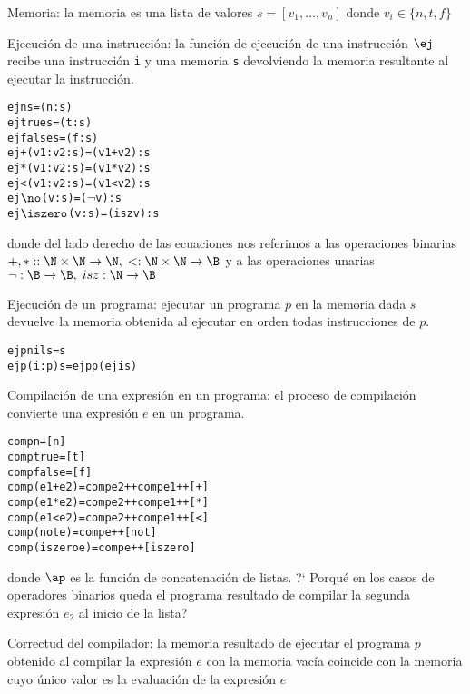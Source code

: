 \documentclass[11pt,letterpaper]{article}
\begin{document}
\item Memoria: la memoria es una lista de valores
$s=[v_1,\ldots,v_n]$ donde $v_i\in\{n,t,f\}$

\item Ejecución de una instrucción: la función de ejecución de una instrucción 
$\ej$ recibe una instrucción {\tt i} y una memoria {\tt s} devolviendo la 
memoria resultante al ejecutar la instrucción.

  \begin{alltt}
    ej n s = (n:s)
    ej true s = (t:s)
    ej false s = (f:s)
    ej + (v1:v2:s) = (v1+v2) : s 
    ej * (v1:v2:s) = (v1*v2) : s
    ej < (v1:v2:s) = (v1<v2) : s
    ej \(\no\) (v:s) = (\(\neg\) v) : s
    ej \(\iszero\) (v:s) = (isz v) : s
  \end{alltt}

donde del lado derecho de las ecuaciones nos referimos a las operaciones 
binarias $+,*::\N\times\N\to\N,\;
<:\N\times\N\to\B$ y a las operaciones unarias $\neg:\B\to\B,\;isz:\N\to\B$ 



\item Ejecución de un programa: ejecutar un programa $p$ en la memoria dada $s$ 
devuelve la memoria obtenida al 
 ejecutar en orden todas instrucciones de $p$.

  \begin{alltt}
    ejp nil s = s
    ejp (i:p) s = ejp p (ej i s)
  \end{alltt}

\item Compilación de una expresión en un programa: el proceso de compilación 
convierte una expresión $e$ en un programa. 

  \begin{alltt}
    comp n = [n]
    comp true = [t]
    comp false = [f]
    comp (e1+e2) = comp e2 ++ comp e1 ++ [+]
    comp (e1*e2) = comp e2 ++ comp e1 ++ [*]
    comp (e1<e2) = comp e2 ++ comp e1 ++ [<]
    comp (not e) = comp e ++ [not] 
    comp (iszero e) = comp e ++ [iszero] 
  \end{alltt}

donde $\ap$ es la función de concatenación de listas. ?` Porqué en los casos de 
operadores binarios queda el programa resultado de compilar la segunda 
expresión $e_2$ al inicio de la lista?


\item Correctud del compilador: la memoria resultado de ejecutar el programa 
$p$ obtenido al compilar la expresión $e$ con la memoria vacía coincide con la 
memoria cuyo único valor es la evaluación de la expresión $e$
\end{document}
